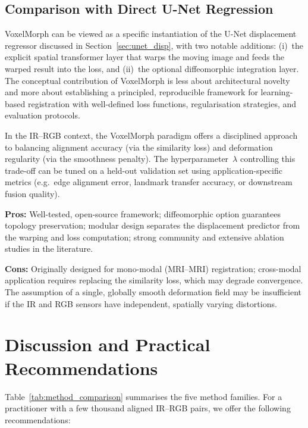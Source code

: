\subsection{Comparison with Direct U-Net Regression}

VoxelMorph can be viewed as a specific instantiation of the U-Net
displacement regressor discussed in Section~\ref{sec:unet_disp}, with
two notable additions: (i)~the explicit spatial transformer layer that
warps the moving image and feeds the warped result into the loss, and
(ii)~the optional diffeomorphic integration layer.  The conceptual
contribution of VoxelMorph is less about architectural novelty and more
about establishing a principled, reproducible framework for
learning-based registration with well-defined loss functions,
regularisation strategies, and evaluation protocols.

In the IR--RGB context, the VoxelMorph paradigm offers a disciplined
approach to balancing alignment accuracy (via the similarity loss) and
deformation regularity (via the smoothness penalty).  The
hyperparameter~$\lambda$ controlling this trade-off can be tuned on a
held-out validation set using application-specific metrics (e.g.\ edge
alignment error, landmark transfer accuracy, or downstream fusion
quality).

\noindent\textbf{Pros:} Well-tested, open-source framework;
diffeomorphic option guarantees topology preservation; modular design
separates the displacement predictor from the warping and loss
computation; strong community and extensive ablation studies in the
literature.

\noindent\textbf{Cons:} Originally designed for mono-modal (MRI--MRI)
registration; cross-modal application requires replacing the similarity
loss, which may degrade convergence.  The assumption of a single,
globally smooth deformation field may be insufficient if the IR and RGB
sensors have independent, spatially varying distortions.


\section{Discussion and Practical Recommendations}
\label{sec:discussion}

Table~\ref{tab:method_comparison} summarises the five method families.
For a practitioner with a few thousand aligned IR--RGB pairs, we offer
the following recommendations:

